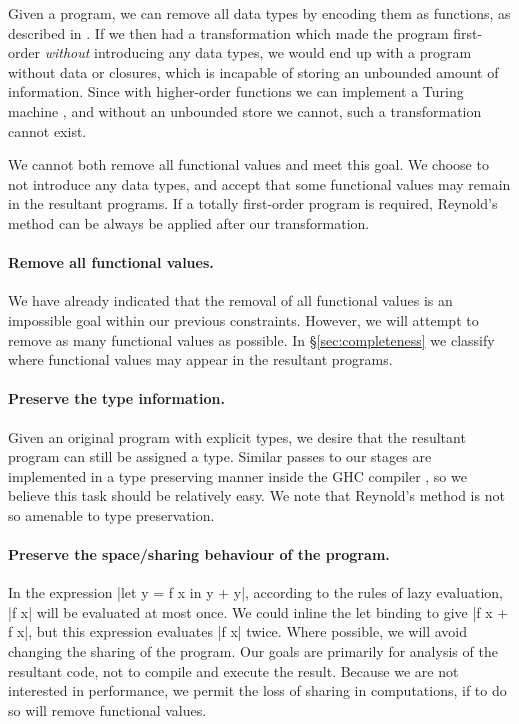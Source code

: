 \documentclass[preprint]{sigplanconf}
\begin{document}
Given a program, we can remove all data types by encoding them as functions, as described in \citet{naylor:reduceron}. If we then had a transformation which made the program first-order \textit{without} introducing any data types, we would end up with a program without data or closures, which is incapable of storing an unbounded amount of information. Since with higher-order functions we can implement a Turing machine \cite{turing:halting}, and without an unbounded store we cannot, such a transformation cannot exist.

We cannot both remove all functional values and meet this goal. We choose to not introduce any data types, and accept that some functional values may remain in the resultant programs. If a totally first-order program is required, Reynold's method can be always be applied after our transformation.

\paragraph{Remove all functional values.} We have already indicated that the removal of all functional values is an impossible goal within our previous constraints. However, we will attempt to remove as many functional values as possible. In \S\ref{sec:completeness} we classify where functional values may appear in the resultant programs.

\paragraph{Preserve the type information.} Given an original program with explicit types, we desire that the resultant program can still be assigned a type. Similar passes to our stages are implemented in a type preserving manner inside the GHC compiler \cite{ghc}, so we believe this task should be relatively easy. We note that Reynold's method is not so amenable to type preservation.

\paragraph{Preserve the space/sharing behaviour of the program.} In the expression |let y = f x in y + y|, according to the rules of lazy evaluation, |f x| will be evaluated at most once. We could inline the let binding to give |f x + f x|, but this expression evaluates |f x| twice. Where possible, we will avoid changing the sharing of the program. Our goals are primarily for analysis of the resultant code, not to compile and execute the result. Because we are not interested in performance, we permit the loss of sharing in computations, if to do so will remove functional values.
\end{document}
